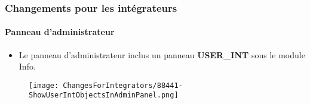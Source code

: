 
\begin{frame}[fragile]
	\frametitle{Changements pour les intégrateurs}
	\framesubtitle{Panneau d'administrateur}

	\begin{itemize}
		\item Le panneau d'administrateur inclus un panneau \textbf{USER\_INT} sous le module Info.
	\end{itemize}

	\begin{figure}
		\texttt{[image: ChangesForIntegrators/88441-ShowUserIntObjectsInAdminPanel.png]}
	\end{figure}

\end{frame}

